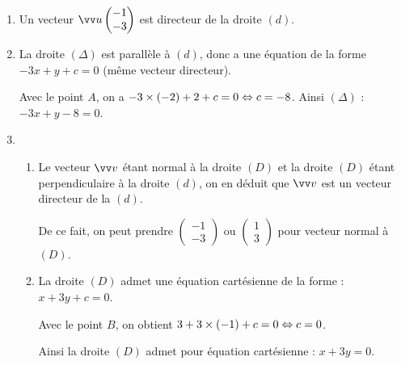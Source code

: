 \documentclass[a4paper,11pt]{article}
\begin{document}
\begin{enumerate}
	\item Un vecteur $\vect{u} \begin{pmatrix} -1 \\ -3 \end{pmatrix}$ est directeur de la droite $(d)$.
	\item La droite $(\Delta)$ est parallèle à $(d)$, donc a une équation de la forme $-3x+y+c=0$ (même vecteur directeur).
	
	Avec le point $A$, on a $-3\times(-2) + 2 + c = 0 \Leftrightarrow c = -8$. Ainsi $(\Delta)$ : $-3x + y - 8 = 0$.
	\item 
	\begin{enumerate}
		\item Le vecteur $\vect{v}$ étant normal à la droite $(D)$ et la droite $(D)$ étant perpendiculaire à la droite $(d)$, on en déduit que $\vect{v}$ est un vecteur directeur de la $(d)$.
		
		De ce fait, on peut prendre $\begin{pmatrix} -1 \\ -3 \end{pmatrix}$ ou $\begin{pmatrix} 1 \\ 3 \end{pmatrix}$ pour vecteur normal à $(D)$.
		\item La droite $(D)$ admet une équation cartésienne de la forme : $x + 3y + c = 0$.
		
		Avec le point $B$, on obtient $3 + 3\times(-1) + c = 0 \Leftrightarrow c = 0$.
		
		Ainsi la droite $(D)$ admet pour équation cartésienne : $x + 3y = 0$.
	\end{enumerate}
\end{enumerate}

\medskip


%
%
%
\end{document}
